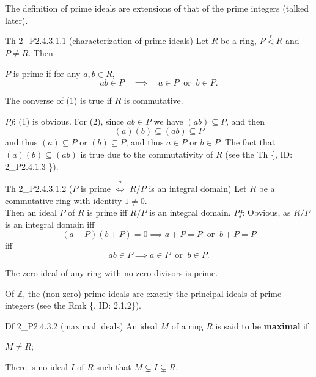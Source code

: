 \documentclass{article}
\newcommand{\nles}{\vartriangleleft}
\newcommand{\ideal}{\overset{\text{r}}{\nles}} %
\begin{document}
\begin{Rmk}{}
    The definition of prime ideals are extensions of that of the prime integers (talked later).
\end{Rmk}

\begin{Th}{Th 2\_P2.4.3.1.1 (characterization of prime ideals)}
    Let $R$ be a ring, $P\ideal R$ and $P\neq R$. Then
    \begin{compactenum}
        \item[(1)] $P$ is prime if for any $a, b\in R$, 
        $$ ab\in P \quad\implies\quad a\in P \;\;\text{or}\;\; b\in P. $$
        \item[(2)] The converse of (1) is true if $R$ is commutative.
    \end{compactenum}
    \tcblower
    \textit{Pf}: (1) is obvious. For (2), since $ab\in P$ we have $(ab)\subseteq P$, and then
    $$ (a)(b) \subseteq (ab) \subseteq P $$
    and thus $(a)\subseteq P$ or $(b)\subseteq P$, and thus $a\in P$ or $b\in P$. The fact that $(a)(b)\subseteq (ab)$ is true due to the commutativity of $R$ (see the Th \{, ID: 2\_P2.4.1.3 \}).
\end{Th}

\begin{Th}{Th 2\_P2.4.3.1.2 ($P$ is prime $\overset{?}{\Longleftrightarrow}$ $R/P$ is an integral domain)}
    Let $R$ be a commutative ring with identity $1\neq 0$. \\
    Then an ideal $P$ of $R$ is prime iff $R/P$ is an integral domain.
    \tcblower
    \textit{Pf}: Obvious, as $R/P$ is an integral domain iff
    $$ (a+P)(b+P) = 0 \implies a+P = P \;\;\text{or}\;\; b+P = P $$
    iff
    $$ ab\in P \implies a\in P \;\;\text{or}\;\; b\in P. $$
\end{Th}

\begin{Rmk}{}
    \begin{compactenum}
        \item \textcolor{Th}{The zero ideal of any ring with no zero divisors is prime.} 
        \item \textcolor{Th}{Of $\mathbb{Z}$, the (non-zero) prime ideals are exactly the principal ideals of prime integers} (see the Rmk \{, ID: 2.1.2\}).
    \end{compactenum}
\end{Rmk}

\begin{Df}{Df 2\_P2.4.3.2 (maximal ideals)}
    An ideal $M$ of a ring $R$ is said to be \textbf{maximal} if
    \begin{compactenum}
        \item $M\neq R$;
        \item There is no ideal $I$ of $R$ such that $M\subsetneq I\subsetneq R$.
    \end{compactenum}
\end{Df}
\end{document}
